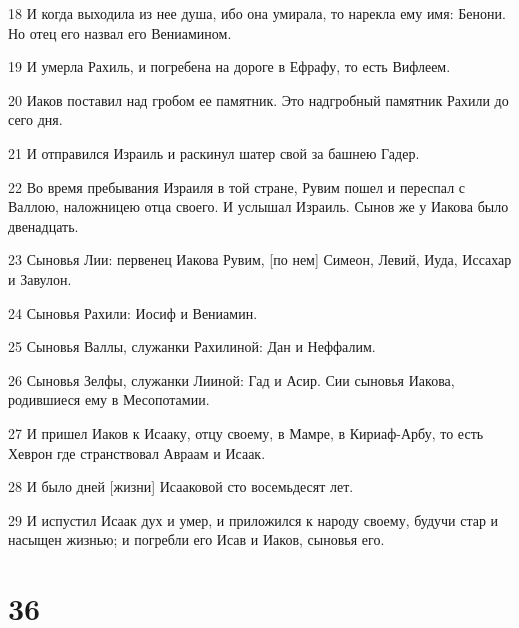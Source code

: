 \par 18 И когда выходила из нее душа, ибо она умирала, то нарекла ему имя: Бенони. Но отец его назвал его Вениамином.
\par 19 И умерла Рахиль, и погребена на дороге в Ефрафу, то есть Вифлеем.
\par 20 Иаков поставил над гробом ее памятник. Это надгробный памятник Рахили до сего дня.
\par 21 И отправился Израиль и раскинул шатер свой за башнею Гадер.
\par 22 Во время пребывания Израиля в той стране, Рувим пошел и переспал с Валлою, наложницею отца своего. И услышал Израиль. Сынов же у Иакова было двенадцать.
\par 23 Сыновья Лии: первенец Иакова Рувим, [по нем] Симеон, Левий, Иуда, Иссахар и Завулон.
\par 24 Сыновья Рахили: Иосиф и Вениамин.
\par 25 Сыновья Валлы, служанки Рахилиной: Дан и Неффалим.
\par 26 Сыновья Зелфы, служанки Лииной: Гад и Асир. Сии сыновья Иакова, родившиеся ему в Месопотамии.
\par 27 И пришел Иаков к Исааку, отцу своему, в Мамре, в Кириаф-Арбу, то есть Хеврон где странствовал Авраам и Исаак.
\par 28 И было дней [жизни] Исааковой сто восемьдесят лет.
\par 29 И испустил Исаак дух и умер, и приложился к народу своему, будучи стар и насыщен жизнью; и погребли его Исав и Иаков, сыновья его.

\chapter{36}

